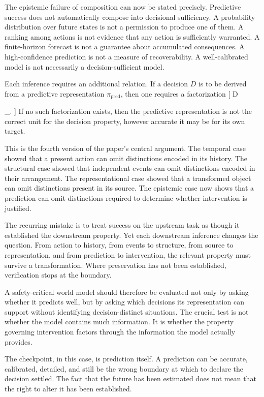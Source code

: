 \documentclass[11pt]{article}
\begin{document}
The epistemic failure of composition can now be stated precisely. Predictive success does not automatically compose into decisional sufficiency. A probability distribution over future states is not a permission to produce one of them. A ranking among actions is not evidence that any action is sufficiently warranted. A finite-horizon forecast is not a guarantee about accumulated consequences. A high-confidence prediction is not a measure of recoverability. A well-calibrated model is not necessarily a decision-sufficient model.

Each inference requires an additional relation. If a decision $D$ is to be derived from a predictive representation $\pi_{\mathrm{pred}}$, then one requires a factorization
[
D

\circ\pi_{}.
]
If no such factorization exists, then the predictive representation is not the correct unit for the decision property, however accurate it may be for its own target.

This is the fourth version of the paper's central argument. The temporal case showed that a present action can omit distinctions encoded in its history. The structural case showed that independent events can omit distinctions encoded in their arrangement. The representational case showed that a transformed object can omit distinctions present in its source. The epistemic case now shows that a prediction can omit distinctions required to determine whether intervention is justified.

The recurring mistake is to treat success on the upstream task as though it established the downstream property. Yet each downstream inference changes the question. From action to history, from events to structure, from source to representation, and from prediction to intervention, the relevant property must survive a transformation. Where preservation has not been established, verification stops at the boundary.

A safety-critical world model should therefore be evaluated not only by asking whether it predicts well, but by asking which decisions its representation can support without identifying decision-distinct situations. The crucial test is not whether the model contains much information. It is whether the property governing intervention factors through the information the model actually provides.

The checkpoint, in this case, is prediction itself. A prediction can be accurate, calibrated, detailed, and still be the wrong boundary at which to declare the decision settled. The fact that the future has been estimated does not mean that the right to alter it has been established.
\end{document}
